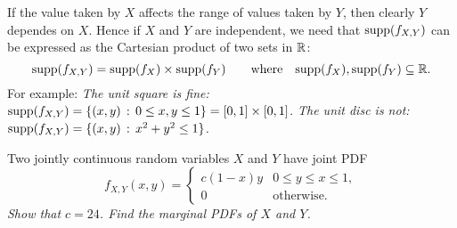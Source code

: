 \begin{remark}
If the value taken by $X$ affects the range of values taken by $Y$, then clearly $Y$ dependes on $X$. Hence if $X$ and $Y$ are independent, we need that $\text{supp}(f_{X,Y})$ can be expressed as the Cartesian product of two sets in $\mathbb{R}$:
\[
\text{supp}(f_{X,Y}) = \text{supp}(f_X)\times \text{supp}(f_Y) \text{\qquad where\quad} \text{supp}(f_X),\text{supp}(f_Y)\subseteq\mathbb{R}.
\]
For example:
\bit
\it The unit square is fine:	$\text{supp}(f_{X,Y})=\{(x,y)\,:\, 0\leq x,y\leq 1\} = [0,1]\times[0,1]$.
\it The unit disc is not:	$\text{supp}(f_{X,Y})=\{(x,y)\,:\,x^2+y^2\leq 1\}$.
\eit
\end{remark}



\begin{example}
Two jointly continuous random variables $X$ and $Y$ have joint PDF
\[
f_{X,Y}(x,y) = 
\left\{\begin{array}{ll}
	c(1-x)y	& 0\leq y \leq x \leq 1, \\
	0		& \text{otherwise.}
\end{array}\right.
\]
\ben
\it Show that $c=24$.
\it Find the marginal PDFs of $X$ and $Y$.
\een
\end{example}

